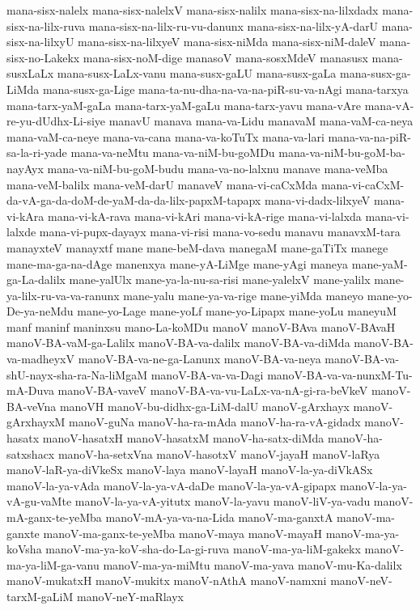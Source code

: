 {mana-sisx-nalelx
mana-sisx-nalelxV
mana-sisx-nalilx
mana-sisx-na-lilxdadx
mana-sisx-na-lilx-ruva
mana-sisx-na-lilx-ru-vu-danunx
mana-sisx-na-lilx-yA-darU
mana-sisx-na-lilxyU
mana-sisx-na-lilxyeV
mana-sisx-niMda
mana-sisx-niM-daleV
mana-sisx-no-Lakekx
mana-sisx-noM-dige
manasoV
mana-sosxMdeV
manasusx
mana-susxLaLx
mana-susx-LaLx-vanu
mana-susx-gaLU
mana-susx-gaLa
mana-susx-ga-LiMda
mana-susx-ga-Lige
mana-ta-nu-dha-na-va-na-piR-su-va-nAgi
mana-tarxya
mana-tarx-yaM-gaLa
mana-tarx-yaM-gaLu
mana-tarx-yavu
mana-vAre
mana-vA-re-yu-dUdhx-Li-siye
manavU
manava
mana-va-Lidu
manavaM
mana-vaM-ca-neya
mana-vaM-ca-neye
mana-va-cana
mana-va-koTuTx
mana-va-lari
mana-va-na-piR-sa-la-ri-yade
mana-va-neMtu
mana-va-niM-bu-goMDu
mana-va-niM-bu-goM-ba-nayAyx
mana-va-niM-bu-goM-budu
mana-va-no-lalxnu
manave
mana-veMba
mana-veM-balilx
mana-veM-darU
manaveV
mana-vi-caCxMda
mana-vi-caCxM-da-vA-ga-da-doM-de-yaM-da-da-lilx-papxM-tapapx
mana-vi-dadx-lilxyeV
mana-vi-kAra
mana-vi-kA-rava
mana-vi-kAri
mana-vi-kA-rige
mana-vi-lalxda
mana-vi-lalxde
mana-vi-pupx-dayayx
mana-vi-risi
mana-vo-sedu
manavu
manavxM-tara
manayxteV
manayxtf
mane
mane-beM-dava
manegaM
mane-gaTiTx
manege
mane-ma-ga-na-dAge
manenxya
mane-yA-LiMge
mane-yAgi
maneya
mane-yaM-ga-La-dalilx
mane-yalUlx
mane-ya-la-nu-sa-risi
mane-yalelxV
mane-yalilx
mane-ya-lilx-ru-va-va-ranunx
mane-yalu
mane-ya-va-rige
mane-yiMda
maneyo
mane-yo-De-ya-neMdu
mane-yo-Lage
mane-yoLf
mane-yo-Lipapx
mane-yoLu
maneyuM
manf
maninf
maninxsu
mano-La-koMDu
manoV
manoV-BAva
manoV-BAvaH
manoV-BA-vaM-ga-Lalilx
manoV-BA-va-dalilx
manoV-BA-va-diMda
manoV-BA-va-madheyxV
manoV-BA-va-ne-ga-Lanunx
manoV-BA-va-neya
manoV-BA-va-shU-nayx-sha-ra-Na-liMgaM
manoV-BA-va-va-Dagi
manoV-BA-va-va-nunxM-Tu-mA-Duva
manoV-BA-vaveV
manoV-BA-va-vu-LaLx-va-nA-gi-ra-beVkeV
manoV-BA-veVna
manoVH
manoV-bu-didhx-ga-LiM-dalU
manoV-gArxhayx
manoV-gArxhayxM
manoV-guNa
manoV-ha-ra-mAda
manoV-ha-ra-vA-gidadx
manoV-hasatx
manoV-hasatxH
manoV-hasatxM
manoV-ha-satx-diMda
manoV-ha-satxshacx
manoV-ha-setxVna
manoV-hasotxV
manoV-jayaH
manoV-laRya
manoV-laR-ya-diVkeSx
manoV-laya
manoV-layaH
manoV-la-ya-diVkASx
manoV-la-ya-vAda
manoV-la-ya-vA-daDe
manoV-la-ya-vA-gipapx
manoV-la-ya-vA-gu-vaMte
manoV-la-ya-vA-yitutx
manoV-la-yavu
manoV-liV-ya-vadu
manoV-mA-ganx-te-yeMba
manoV-mA-ya-va-na-Lida
manoV-ma-ganxtA
manoV-ma-ganxte
manoV-ma-ganx-te-yeMba
manoV-maya
manoV-mayaH
manoV-ma-ya-koVsha
manoV-ma-ya-koV-sha-do-La-gi-ruva
manoV-ma-ya-liM-gakekx
manoV-ma-ya-liM-ga-vanu
manoV-ma-ya-miMtu
manoV-ma-yava
manoV-mu-Ka-dalilx
manoV-mukatxH
manoV-mukitx
manoV-nAthA
manoV-namxni
manoV-neV-tarxM-gaLiM
manoV-neY-maRlayx
}
